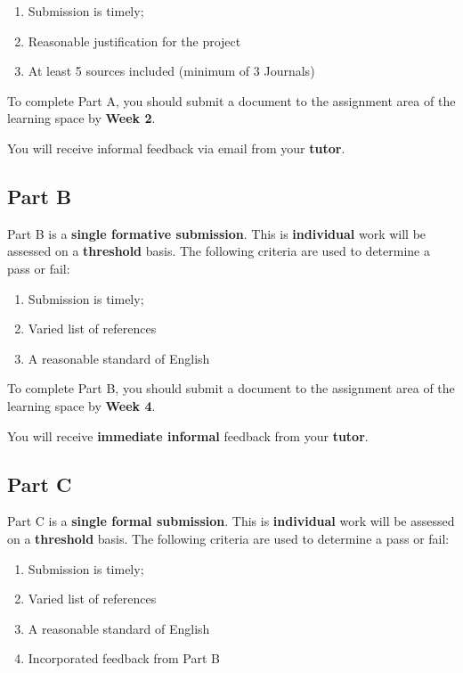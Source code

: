 \documentclass{../../fal_assignment}
\begin{document}
\begin{enumerate}[label=(\alph*)]
	\item Submission is timely;
	\item Reasonable justification for the project
	\item At least 5 sources included (minimum of 3 Journals)
\end{enumerate}

To complete Part A, you should submit a document to the assignment area of the learning space by \textbf{Week 2}.

You will receive informal feedback via email from your \textbf{tutor}.

\subsection*{Part B}

Part B is a \textbf{single formative submission}. This is \textbf{individual} work will be assessed on a \textbf{threshold} basis. The following criteria are used to determine a pass or fail: 

\begin{enumerate}[label=(\alph*)]
	\item Submission is timely;
	\item Varied list of references
	\item A reasonable standard of English
\end{enumerate}

To complete Part B, you should submit a document to the assignment area of the learning space by \textbf{Week 4}.

You will receive \textbf{immediate informal} feedback from your \textbf{tutor}.


\subsection*{Part C}

Part C is a \textbf{single formal submission}. This is \textbf{individual} work will be assessed on a \textbf{threshold} basis. The following criteria are used to determine a pass or fail: 

\begin{enumerate}[label=(\alph*)]
	\item Submission is timely;
	\item Varied list of references
	\item A reasonable standard of English
	\item Incorporated feedback from Part B
\end{enumerate}
\end{document}
